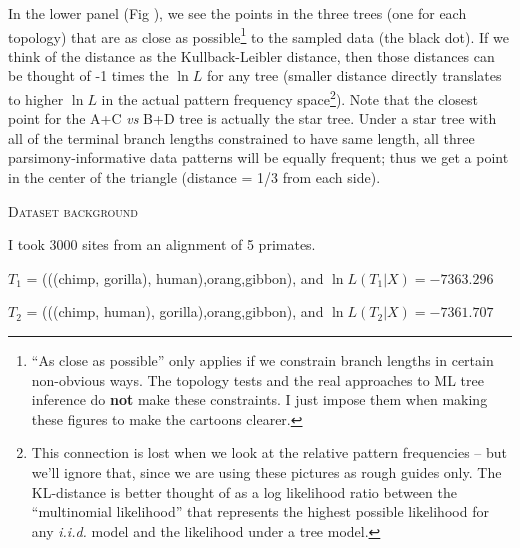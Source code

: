 \documentclass[11pt]{article}
\renewcommand{\section}[2]{%
\addcontentsline{toc}{section}{#2}
\bigskip
\begin{center}
\begin{Large}
\normalfont\scshape #2
\medskip
\end{Large}
\end{center}}
\newcommand{\lnL}{\ln L}
\begin{document}
In the lower panel (Fig ), we see the points in the three trees (one for each topology) that are as close as possible\footnote{``As close as possible'' only applies if we constrain branch lengths in certain non-obvious ways. The topology tests and the real approaches to ML tree inference do {\bf not} make these constraints. I just impose them when making these figures to make the cartoons clearer.} to the sampled data (the black dot).
If we think of the distance as the Kullback-Leibler distance, then those distances can be thought of -1 times the $\lnL$ for any tree (smaller distance directly translates to higher $\lnL$ in the actual pattern frequency space\footnote{This connection is lost when we look at the relative pattern frequencies -- but we'll ignore that, since we are using these pictures as rough guides only. The KL-distance is better thought of as a log likelihood ratio between the ``multinomial likelihood'' \citep[{\em aka} the ``unconstrained likelihood'' of][]{Goldman1993} that represents the highest possible likelihood for any {\em i.i.d.} model and the likelihood under a tree model.}).
Note that the closest point for the A+C {\em vs} B+D tree is actually the star tree.
Under a star tree with all of the terminal branch lengths constrained to have same length, all three parsimony-informative data patterns will be equally frequent; thus we get a point in the center of the triangle (distance = 1/3 from each side).


\newpage
\section*{Dataset background}
I took 3000 sites from an alignment of 5 primates.

$T_1$ = (((chimp, gorilla), human),orang,gibbon), and $\ln L(T_1|X) = -7363.296$\par
$T_2$ = (((chimp, human), gorilla),orang,gibbon), and $\ln L(T_2|X) = -7361.707$\par
\end{document}
